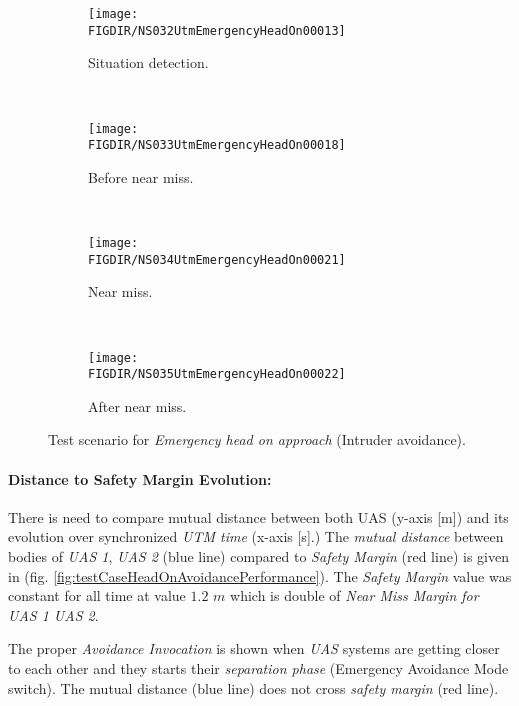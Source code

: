 \begin{figure}[H]
    \centering
    \begin{subfigure}{0.75\textwidth}
        \centering
        \texttt{[image: \\FIGDIR/NS032UtmEmergencyHeadOn00013]}
        \caption{Situation detection.}
        \label{fig:emergencyHeadOnSituationDetection}
    \end{subfigure}
    \\
    \begin{subfigure}{0.75\textwidth}
        \centering
        \texttt{[image: \\FIGDIR/NS033UtmEmergencyHeadOn00018]} 
        \caption{Before near miss.}
        \label{fig:emergencyHeadOnBeforeNearMiss}
    \end{subfigure}
    \\
    \begin{subfigure}{0.75\textwidth}
        \centering
        \texttt{[image: \\FIGDIR/NS034UtmEmergencyHeadOn00021]} 
        \caption{Near miss.}
        \label{fig:emergencyHeadOnNearMiss}
    \end{subfigure}
    \\
    \begin{subfigure}{0.75\textwidth}
        \centering
        \texttt{[image: \\FIGDIR/NS035UtmEmergencyHeadOn00022]} 
        \caption{After near miss.}
        \label{fig:emergencyHeadOnAfterNearMiss}
    \end{subfigure}
    \caption{Test scenario for \emph{Emergency head on approach} (Intruder avoidance). }
    \label{fig:testCaseEmergencyHeadOnApproach}
\end{figure}


\paragraph{Distance to Safety Margin Evolution:} There is need to compare mutual distance between both UAS (y-axis [m]) and its evolution over synchronized \emph{UTM time} (x-axis [s].) The \emph{mutual distance} between bodies of \emph{UAS 1}, \emph{UAS 2} (blue line) compared to \emph{Safety Margin} (red line) is given in (fig. \ref{fig:testCaseHeadOnAvoidancePerformance}). The \emph{Safety Margin} value was constant for all time at value $1.2$ $m$ which is double of \emph{Near Miss Margin for UAS 1 UAS 2}.

The proper \emph{Avoidance Invocation} is shown when \emph{UAS} systems are getting closer to each other and they starts their \emph{separation phase} (Emergency Avoidance Mode switch). The mutual distance (blue line) does not cross \emph{safety margin} (red line).

